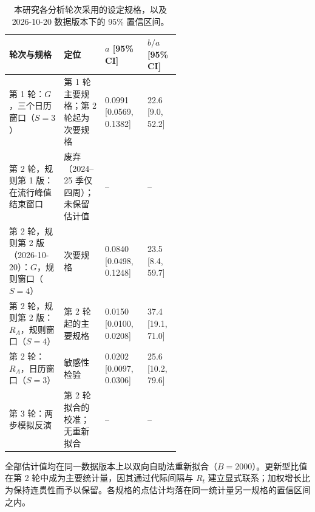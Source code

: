 \begin{table}[htbp]
\centering
\footnotesize
\setlength{\tabcolsep}{4pt}
\caption{本研究各分析轮次采用的设定规格，以及 2026-10-20 数据版本下的 95\% 置信区间。}
\label{tab:s9}
\begin{tabular}{p{0.32\linewidth}p{0.24\linewidth}ll}
\toprule
轮次与规格 & 定位 & $a$ [95\% CI] & $b/a$ [95\% CI] \\
\midrule
第 1 轮：$G$，三个日历窗口（$S=3$） & 第 1 轮主要规格；第 2 轮起为次要规格 & 0.0991 [0.0569, 0.1382] & 22.6 [9.0, 52.2] \\
第 2 轮，规则第 1 版：在流行峰值结束窗口 & 废弃（2024--25 季仅四周）；未保留估计值 & -- & -- \\
第 2 轮，规则第 2 版（2026-10-20）：$G$，规则窗口（$S=4$） & 次要规格 & 0.0840 [0.0498, 0.1248] & 23.5 [8.4, 59.7] \\
第 2 轮，规则第 2 版：$R_A$，规则窗口（$S=4$） & 第 2 轮起的主要规格 & 0.0150 [0.0100, 0.0208] & 37.4 [19.1, 71.0] \\
第 2 轮：$R_A$，日历窗口（$S=3$） & 敏感性检验 & 0.0202 [0.0097, 0.0306] & 25.6 [10.2, 79.6] \\
第 3 轮：两步模拟反演 & 第 2 轮拟合的校准；无重新拟合 & -- & -- \\
\bottomrule
\end{tabular}
\par\smallskip
\begin{minipage}{0.95\linewidth}\scriptsize 全部估计值均在同一数据版本上以双向自助法重新拟合（$B=2000$）。更新型比值在第 2 轮中成为主要统计量，因其通过代际间隔与 $R_t$ 建立显式联系；加权增长比为保持连贯性而予以保留。各规格的点估计均落在同一统计量另一规格的置信区间之内。\end{minipage}
\end{table}
